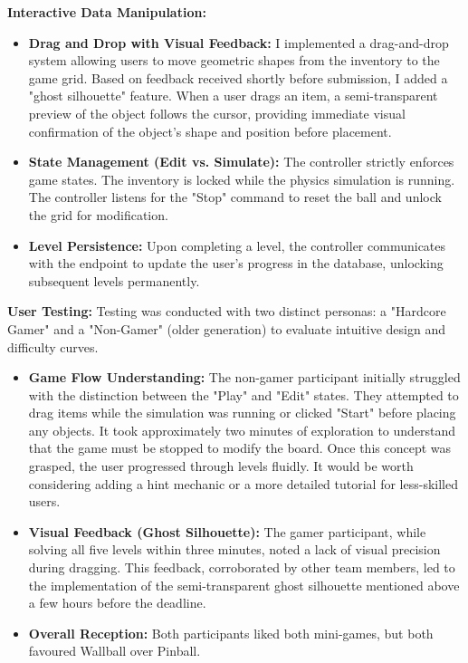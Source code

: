 \documentclass[11pt]{article}
\begin{document}
\textbf{Interactive Data Manipulation:}
\begin{itemize}
    \item \textbf{Drag and Drop with Visual Feedback:} 
    I implemented a drag-and-drop system allowing users to move geometric shapes from the inventory to the game grid. Based on feedback received shortly before submission, I added a "ghost silhouette" feature. When a user drags an item, a semi-transparent preview of the object follows the cursor, providing immediate visual confirmation of the object's shape and position before placement.
    
    \item \textbf{State Management (Edit vs. Simulate):}
    The controller strictly enforces game states. The inventory is locked while the physics simulation is running. The controller listens for the "Stop" command to reset the ball and unlock the grid for modification.
    
    \item \textbf{Level Persistence:}
    Upon completing a level, the controller communicates with the  endpoint to update the user's progress in the database, unlocking subsequent levels permanently.
\end{itemize}

\textbf{User Testing:}
Testing was conducted with two distinct personas: a "Hardcore Gamer" and a "Non-Gamer" (older generation) to evaluate intuitive design and difficulty curves.
\begin{itemize}
    \item \textbf{Game Flow Understanding:} The non-gamer participant initially struggled with the distinction between the "Play" and "Edit" states. They attempted to drag items while the simulation was running or clicked "Start" before placing any objects. It took approximately two minutes of exploration to understand that the game must be stopped to modify the board. Once this concept was grasped, the user progressed through levels fluidly. It would be worth considering adding a hint mechanic or a more detailed tutorial for less-skilled users.
    \item \textbf{Visual Feedback (Ghost Silhouette):} The gamer participant, while solving all five levels within three minutes, noted a lack of visual precision during dragging. This feedback, corroborated by other team members, led to the implementation of the semi-transparent ghost silhouette mentioned above a few hours before the deadline.
    \item \textbf{Overall Reception:} Both participants liked both mini-games, but both favoured Wallball over Pinball.
\end{itemize}
\end{document}
